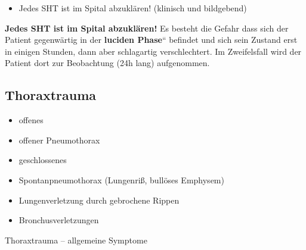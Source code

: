 \documentclass{article}
\newcommand\gEs[1]{\textbf{\textcolor[rgb]{0.0,0.0,0.5019608}{#1}}}
\newcommand\gEs[1]{\textbf{\textcolor[rgb]{0.0,0.0,0.5019608}{#1}}}
\begin{document}
\begin{itemize}
\item {\mdseries
Jedes SHT ist im Spital abzukl\"aren! (klinisch und  bildgebend)}

\end{itemize}
{\mdseries\color{black}
\gEs{Jedes SHT ist im Spital abzukl\"aren!} Es
besteht die Gefahr dass sich der Patient gegenw\"artig in der
{\quotedblbase}\gEs{luciden
Phase}{\textquotedblleft} befindet und sich sein Zustand erst in
einigen Stunden, dann aber schlagartig verschlechtert. Im Zweifelsfall
wird der Patient dort zur  Beobachtung (24h lang) aufgenommen.}

\subsection{Thoraxtrauma}
\begin{itemize}
\item {\mdseries
offenes}

\end{itemize}
\begin{itemize}
\item {\mdseries
offener Pneumothorax}

\end{itemize}
\begin{itemize}
\item {\mdseries
geschlossenes}

\end{itemize}
\begin{itemize}
\item {\mdseries
{}Spontanpneumothorax (Lungenri{\ss},
bull\"oses  Emphysem)}

\item {\mdseries
Lungenverletzung durch gebrochene Rippen }

\item {\mdseries
Bronchusverletzungen}

\end{itemize}
{\mdseries\color{black}
Thoraxtrauma -- allgemeine  Symptome}
\end{document}
